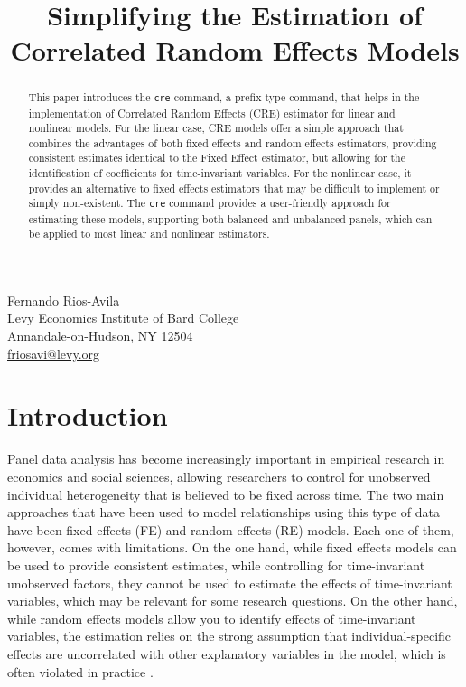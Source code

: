 \documentclass[bib]{statapress}
\begin{document}


 
\title[]{Simplifying the Estimation of Correlated Random Effects Models}


\makeatletter

\author{}{
Fernando Rios-Avila
\\
Levy Economics Institute of Bard College\\
Annandale-on-Hudson, NY 12504
\\
\href{mailto:friosavi@levy.org}{friosavi@levy.org}
}
 
 
 

\maketitle

\begin{abstract}

This paper introduces the \texttt{cre} command, a prefix type command,
that helps in the implementation of Correlated Random Effects (CRE)
estimator for linear and nonlinear models. For the linear case, CRE
models offer a simple approach that combines the advantages of both
fixed effects and random effects estimators, providing consistent
estimates identical to the Fixed Effect estimator, but allowing for the
identification of coefficients for time-invariant variables. For the
nonlinear case, it provides an alternative to fixed effects estimators
that may be difficult to implement or simply non-existent. The
\texttt{cre} command provides a user-friendly approach for estimating
these models, supporting both balanced and unbalanced panels, which can
be applied to most linear and nonlinear estimators.

\end{abstract}

\section{Introduction}\label{introduction}

Panel data analysis has become increasingly important in empirical
research in economics and social sciences, allowing researchers to
control for unobserved individual heterogeneity that is believed to be
fixed across time. The two main approaches that have been used to model
relationships using this type of data have been fixed effects (FE) and
random effects (RE) models. Each one of them, however, comes with
limitations. On the one hand, while fixed effects models can be used to
provide consistent estimates, while controlling for time-invariant
unobserved factors, they cannot be used to estimate the effects of
time-invariant variables, which may be relevant for some research
questions. On the other hand, while random effects models allow you to
identify effects of time-invariant variables, the estimation relies on
the strong assumption that individual-specific effects are uncorrelated
with other explanatory variables in the model, which is often violated
in practice \citep{wooldridge2019}.
\end{document}
